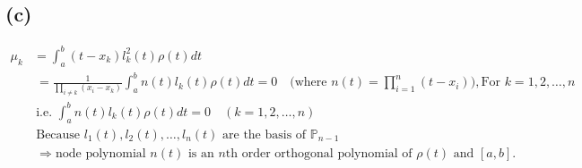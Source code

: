 \documentclass[a4paper]{article}
\begin{document}
\subsection*{(c)}
\begin{align*}
   \mu_k &= \int_a^b (t - x_k) l_k^2(t) \rho(t) dt \\
  &\ =\frac{1}{\prod_{i \neq k} (x_i - x_k)} \int_a^b n(t) l_k(t) \rho(t) dt = 0 \quad \text{(where } n(t) = \prod_{i=1}^n (t - x_i) \text{)} , \text{For } k = 1, 2, \ldots, n \\
  &\ \text{i.e. }\int_a^b n(t) l_k(t) \rho(t) dt = 0 \quad (k = 1, 2, \ldots, n) \\
  &\ \text{Because } l_1(t), l_2(t), \ldots, l_n(t) \text{ are the basis of } \mathbb{P}_{n-1} \\
  &\ \Rightarrow \text{node polynomial }n(t) \text{ is an } n \text{th order orthogonal polynomial of $\rho(t)$ and $[a,b]$.}
\end{align*}
\end{document}
